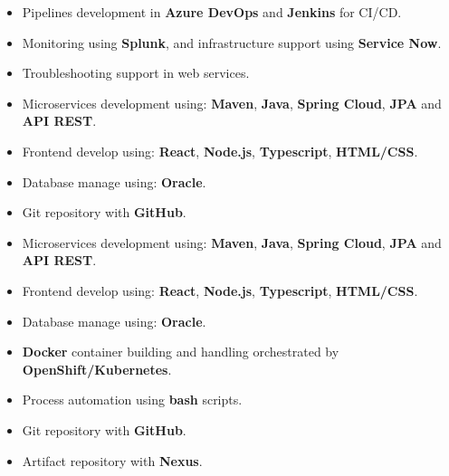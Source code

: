 \documentclass[letterpaper]{style} %
\begin{document}
\begin{itemize}
	\item Pipelines development in \textbf{Azure DevOps} and \textbf{Jenkins} for CI/CD.
	\item Monitoring using \textbf{Splunk}, and infrastructure support using \textbf{Service Now}.
	\item Troubleshooting support in web services.
	\item Microservices development using: \textbf{Maven}, \textbf{Java}, \textbf{Spring Cloud}, \textbf{JPA} and \textbf{API REST}.
	\item Frontend develop using: \textbf{React}, \textbf{Node.js}, \textbf{Typescript}, \textbf{HTML/CSS}.
	\item Database manage using: \textbf{Oracle}.
	\item Git repository with \textbf{GitHub}.
\end{itemize}

\divider

\begin{itemize}
	\item Microservices development using: \textbf{Maven}, \textbf{Java}, \textbf{Spring Cloud}, \textbf{JPA} and \textbf{API REST}.
	\item Frontend develop using: \textbf{React}, \textbf{Node.js}, \textbf{Typescript}, \textbf{HTML/CSS}.
	\item Database manage using: \textbf{Oracle}.
	\item \textbf{Docker} container building and handling orchestrated by \textbf{OpenShift/Kubernetes}.
	\item Process automation using \textbf{bash} scripts.
	\item Git repository with \textbf{GitHub}.
	\item Artifact repository with \textbf{Nexus}.
\end{itemize}


\end{document}
